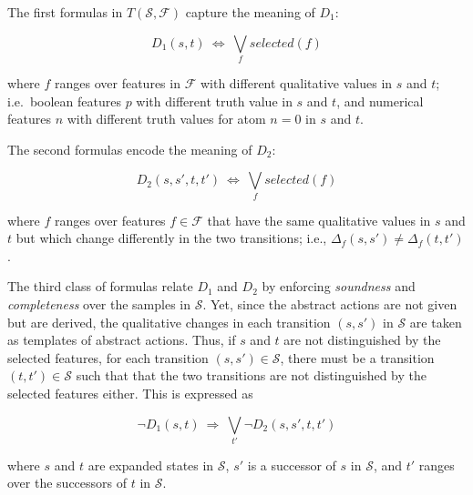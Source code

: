 \documentclass[letterpaper]{article} %
\newcommand{\Omit}[1]{}
\newcommand{\F}{\mathcal{F}}
\renewcommand{\S}{\mathcal{S}}
\begin{document}
\medskip
\noindent The first formulas in $T(\S,\F)$ capture the meaning of $D_1$:
  
\begin{equation}
  \label{eq:d1}
  D_1(s, t) \ \Leftrightarrow\ \textstyle \bigvee_{f}  selected(f)
\end{equation}

\noindent where $f$ ranges over features in $\F$ with  different qualitative
values in $s$ and $t$; i.e.\ boolean features $p$ with different truth value
in $s$ and $t$, and numerical features $n$ with different truth values for
atom $n=0$ in $s$ and $t$. 

\noindent The second formulas encode the meaning of $D_2$:

\begin{equation}
  \label{eq:d2}
  D_2(s, s', t, t') \ \Leftrightarrow\ \textstyle\bigvee_f  selected(f)
\end{equation}

\noindent where $f$ ranges over features $f \in \F$ that have the same
qualitative values in $s$ and $t$ but which change differently in the two
transitions; i.e., $\Delta_f(s, s') \neq \Delta_f(t, t')$.

The third class of formulas relate $D_1$ and $D_2$ by enforcing \emph{soundness}
and \emph{completeness} over  the samples in $\S$.
Yet, since the abstract actions  are not given but are derived, the qualitative changes in each  transition $(s,s')$ in $\S$
are  taken as templates  of abstract actions. Thus, if $s$ and $t$ are not distinguished by the selected features, 
for each transition $(s, s') \in \S$, there must be a transition $(t, t') \in \S$
such that that the two transitions are not distinguished by the selected features either.
This is expressed as

\begin{equation}
  \label{eq:bridge1}
  \neg D_1(s, t) \  \Rightarrow\ \textstyle\bigvee_{t'} \neg D_2(s, s', t, t')
\end{equation}

\noindent where $s$ and $t$ are expanded states in  $\S$, $s'$ is a successor of $s$ in $\S$,
and $t'$ ranges over the successors of $t$ in $\S$.

\Omit{ %
  Refer to this as an ``efficiency optimization'' ..
  
  such that $s < t$, and transition $(s,s')$ in $\S$. Due to the symmetry breaking caused by the constraint $s < t$,
  the following formulas are also needed

\begin{equation}
  \label{eq:bridge2}
  \neg D_1(s, t) \, \rightarrow \, \bigvee_{s'} \neg D_2(s, s', t, t')
\end{equation}

\noindent where the  iteration in the right hand disjunction goes over the different successor states $s'$ of the first argument
$s$ of $D_1$ that are in the sample set $\S$, $s$ and $t$ are states in $\S_1$ as before with $s < t$, and $t'$ is a
successor state of $t$ in $\S$; i.e. $(t,t') \in \S$.
}
\end{document}
